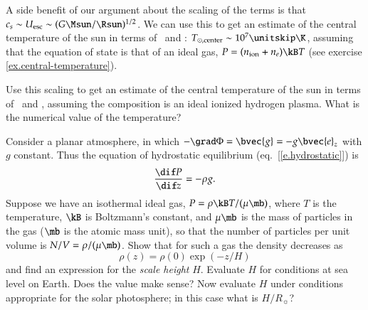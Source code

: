 A side benefit of our argument about the scaling of the terms is that $c_{s}\sim U_{\mathrm{esc}} \sim (G\Msun/\Rsun)^{1/2}$.  We can use this to get an estimate of the central temperature of the sun in terms of \Msun\ and \Rsun: $T_{\sun,\mathrm{center}}\sim 10^{7}\nsp\K$, assuming that the equation of state is that of an ideal gas, $P = (n_{\mathrm{ion}} + n_{e})\kB T$ (see exercise \ref{ex.central-temperature}). 

\begin{exercisebox}
\label{ex.central-temperature}
Use this scaling to get an estimate of the central temperature of the sun in terms of \Msun\ and \Rsun, assuming the composition is an ideal ionized hydrogen plasma.  What is the numerical value of the temperature?
\end{exercisebox}

\begin{exercisebox}
\label{ex:planar-atmosphere}
Consider a planar atmosphere, in which $-\grad\Phi = \bvec{g} = -g \bvec{e}_{z}$ with $g$ constant. Thus the equation of hydrostatic equilibrium (eq.~[\ref{e.hydrostatic}]) is
\begin{equation}\label{e.planar-hydrostatic}
\frac{\dif P}{\dif z} = -\rho g.
\end{equation}
Suppose we have an isothermal ideal gas, $P = \rho\kB T/(\mu\mb)$, where $T$ is the temperature, $\kB$ is Boltzmann's constant, and $\mu\mb$ is the mass of particles in the gas ($\mb$ is the atomic mass unit), so that the number of particles per unit volume is $N/V = \rho/(\mu\mb)$.  Show that for such a gas the density decreases as
\[
\rho(z) = \rho(0) \exp\left(-z/H\right)
\]
and find an expression for the \emph{scale height} $H$.  Evaluate $H$ for conditions at sea level on Earth. Does the value make sense? Now evaluate $H$ under conditions appropriate for the solar photosphere; in this case what is $H/R_{\sun}$?
\end{exercisebox}

